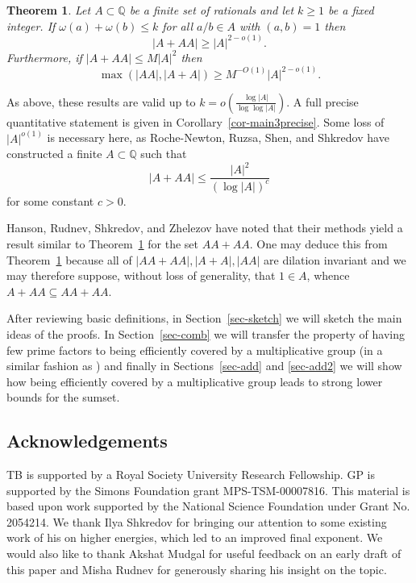 \documentclass{amsart}
\renewcommand{\leq}{\leqslant}
\renewcommand{\geq}{\geqslant}
\newcommand{\bbq}{\mathbb{Q}}
\newcommand{\abs}[1]{\left\lvert #1\right\rvert}
\newtheorem{theorem}{Theorem}
\theoremstyle{definition}
\begin{document}
\begin{theorem}\label{th-main3}
Let $A\subset \bbq$ be a finite set of rationals and let $k\geq 1$ be a fixed integer. If $\omega(a)+\omega(b)\leq k$ for all $a/b\in A$ with $(a,b)=1$ then
\[\abs{A+AA}\geq \abs{A}^{2-o(1)}.\]
Furthermore, if $\abs{A+AA}\leq M\abs{A}^{2}$ then
\[\max(\abs{AA},\abs{A+A})\geq M^{-O(1)}\abs{A}^{2-o(1)}.\]
\end{theorem}
As above, these results are valid up to $k=o(\frac{\log \abs{A}}{\log\log \abs{A}})$. A full precise quantitative statement is given in  Corollary~\ref{cor-main3precise}. Some loss of $\abs{A}^{o(1)}$ is necessary here, as Roche-Newton, Ruzsa, Shen, and Shkredov \cite{RRSS19} have constructed a finite $A\subset \bbq$ such that
\[\abs{A+AA}\leq \frac{\abs{A}^2}{(\log \abs{A})^{c}}\]
for some constant $c>0$.

Hanson, Rudnev, Shkredov, and Zhelezov \cite{HRSZ25} have noted that their methods yield a result similar to Theorem~\ref{th-main3} for the set $AA+AA$. One may deduce this from Theorem~\ref{th-main3} because all of $|AA+AA|, |A+A|, |AA|$ are dilation invariant and we may therefore suppose, without loss of generality, that $1 \in A$, whence $A+AA\subseteq AA+AA$.

After reviewing basic definitions, in Section~\ref{sec-sketch} we will sketch the main ideas of the proofs. In Section~\ref{sec-comb} we will transfer the property of having few prime factors to being efficiently covered by a multiplicative group (in a similar fashion as \cite{HRSZ25}) and finally in Sections~\ref{sec-add} and \ref{sec-add2} we will show how being efficiently covered by a multiplicative group leads to strong lower bounds for the sumset.

\subsection*{Acknowledgements} TB is supported by a Royal Society University Research Fellowship. GP is supported by the Simons Foundation grant MPS-TSM-00007816. This material is based upon work supported by the National Science Foundation under Grant No. 2054214. We thank Ilya Shkredov for bringing our attention to some existing work of his on higher energies, which led to an improved final exponent. We would also like to thank Akshat Mudgal for useful feedback on an early draft of this paper and Misha Rudnev for generously sharing his insight on the topic.
\end{document}
